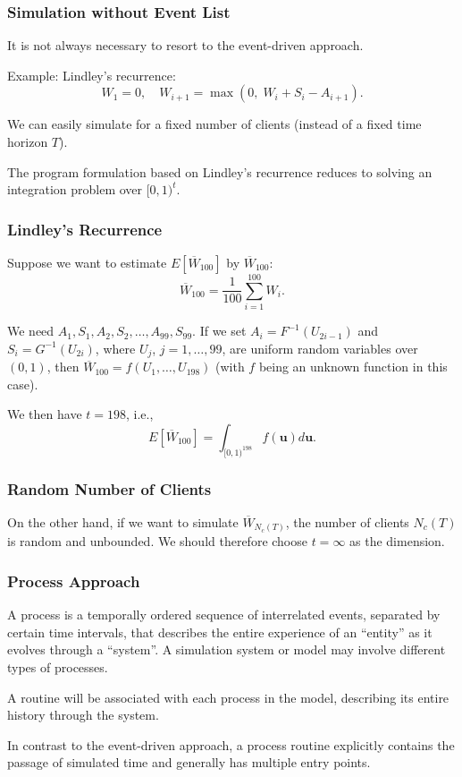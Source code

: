 \documentclass[t,usepdftitle=false]{beamer}
\def\bu{\boldsymbol{u}}
\begin{document}
\begin{frame}
	\frametitle{Simulation without Event List}
	
	It is not always necessary to resort to the event-driven approach.
	
	\mbox{}
	
	Example: Lindley's recurrence:
	\[
	W_1 = 0,\quad W_{i+1} = \max(0,\; W_i + S_i - A_{i+1}).
	\]
	
	We can easily simulate for a fixed number of clients (instead of a fixed time horizon $T$).
	
	\mbox{}
	
	The program formulation based on Lindley's recurrence reduces to solving an integration problem over $[0,1)^t$.
	
\end{frame}

\begin{frame}
	\frametitle{Lindley's Recurrence}
	
	Suppose we want to estimate \(E[\overline{W}_{100}]\) by \({\overline{W}_{100}}\):
	\[
	{\overline{W}_{100}} = \frac{1}{100} \sum_{i=1}^{100} W_i.
	\]
	
	\mbox{}
	
	We need \(A_1, S_1, A_2, S_2, \dots, A_{99}, S_{99}\). If we set \({A_i} = F^{-1}(U_{2i-1})\) and \({S_i} = G^{-1}(U_{2i})\), where \(U_j\), \(j = 1,\ldots,99\), are uniform random variables over \((0,1)\), then \(\overline{W}_{100} = f(U_1,\dots,U_{198})\) (with \(f\) being an unknown function in this case).
	
	\mbox{}
	
	We then have \(t=198\), i.e., 
	\[
	E[\overline{W}_{100}] = \int_{[0,1)^{198}} f(\bu)d\bu.
	\]
	
\end{frame}

\begin{frame}
	\frametitle{Random Number of Clients}
	
	On the other hand, if we want to simulate \(\overline{W}_{N_c(T)}\), the number of clients 
	\(N_c(T)\) is random and unbounded. 
	We should therefore choose \(t=\infty\) as the dimension.
	
\end{frame}

\begin{frame}
	\frametitle{Process Approach}
	
	A process is a temporally ordered sequence of interrelated events, separated by certain time intervals,
	that describes the entire experience of an ``entity'' as it evolves through a ``system''.
	A simulation system or model may involve different types of processes.
	
	\mbox{}
	
	A routine will be associated with each process in the model, describing its
	entire history through the system.
	
	\mbox{}
	
	In contrast to the event-driven approach, a process routine
	explicitly contains the passage of simulated time and generally has
	multiple entry points.
	
\end{frame}
\end{document}
